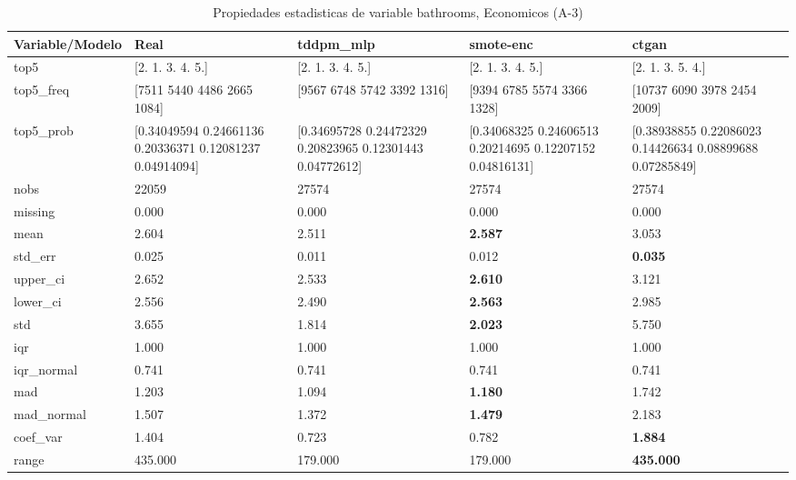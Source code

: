 \begin{table}[H]
\centering
\fontsize{8}{14}\selectfont
\caption{Propiedades  estadisticas de variable bathrooms, Economicos (A-3)}
\label{table-stats-economicos-a-3-bathrooms}
\begin{tabular}{|l|m{10em}|m{10em}|m{10em}|m{10em}|}
\hline
 \rowcolor[gray]{0.8}
Variable/Modelo & Real & tddpm\_mlp & smote-enc & ctgan \\
\hline top5 & [2. 1. 3. 4. 5.] & [2. 1. 3. 4. 5.] & [2. 1. 3. 4. 5.] & [2. 1. 3. 5. 4.] \\
\hline top5\_freq & [7511 5440 4486 2665 1084] & [9567 6748 5742 3392 1316] & [9394 6785 5574 3366 1328] & [10737  6090  3978  2454  2009] \\
\hline top5\_prob & [0.34049594 0.24661136 0.20336371 0.12081237 0.04914094] & [0.34695728 0.24472329 0.20823965 0.12301443 0.04772612] & [0.34068325 0.24606513 0.20214695 0.12207152 0.04816131] & [0.38938855 0.22086023 0.14426634 0.08899688 0.07285849] \\
\hline nobs & 22059 & 27574 & 27574 & 27574 \\
\hline missing & 0.000 & 0.000 & 0.000 & 0.000 \\
\hline mean & 2.604 & 2.511 & \bfseries 2.587 & \cellcolor[rgb]{0.9, 0.54, 0.52} 3.053 \\
\hline std\_err & 0.025 & \cellcolor[rgb]{0.9, 0.54, 0.52} 0.011 & 0.012 & \bfseries 0.035 \\
\hline upper\_ci & 2.652 & 2.533 & \bfseries 2.610 & \cellcolor[rgb]{0.9, 0.54, 0.52} 3.121 \\
\hline lower\_ci & 2.556 & 2.490 & \bfseries 2.563 & \cellcolor[rgb]{0.9, 0.54, 0.52} 2.985 \\
\hline std & 3.655 & 1.814 & \bfseries 2.023 & \cellcolor[rgb]{0.9, 0.54, 0.52} 5.750 \\
\hline iqr & 1.000 & 1.000 & 1.000 & 1.000 \\
\hline iqr\_normal & 0.741 & 0.741 & 0.741 & 0.741 \\
\hline mad & 1.203 & 1.094 & \bfseries 1.180 & \cellcolor[rgb]{0.9, 0.54, 0.52} 1.742 \\
\hline mad\_normal & 1.507 & 1.372 & \bfseries 1.479 & \cellcolor[rgb]{0.9, 0.54, 0.52} 2.183 \\
\hline coef\_var & 1.404 & \cellcolor[rgb]{0.9, 0.54, 0.52} 0.723 & 0.782 & \bfseries 1.884 \\
\hline range & 435.000 & \cellcolor[rgb]{0.9, 0.54, 0.52} 179.000 & \cellcolor[rgb]{0.9, 0.54, 0.52} 179.000 & \bfseries 435.000 \\

\end{tabular}
\end{table}
